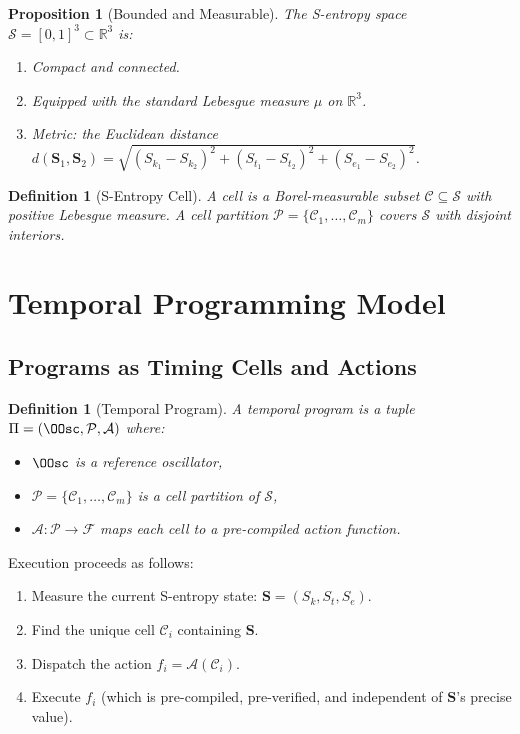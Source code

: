 \documentclass[twocolumn,11pt,a4paper]{article}
\newtheorem{proposition}[theorem]{Proposition}
\newtheorem{definition}[theorem]{Definition}
\newcommand{\Sk}{S_k}
\newcommand{\St}{S_t}
\newcommand{\Se}{S_e}
\newcommand{\Stuple}{\mathbf{S}}
\newcommand{\calC}{\mathcal{C}}
\newcommand{\calP}{\mathcal{P}}
\newcommand{\calS}{\mathcal{S}}
\begin{document}
\begin{proposition}[Bounded and Measurable]
The S-entropy space $\calS = [0,1]^3 \subset \mathbb{R}^3$ is:
\begin{enumerate}[nosep,label=(\roman*)]
  \item Compact and connected.
  \item Equipped with the standard Lebesgue measure $\mu$ on $\mathbb{R}^3$.
  \item Metric: the Euclidean distance $d(\Stuple_1, \Stuple_2) = \sqrt{(\Sk_1 - \Sk_2)^2 + (\St_1 - \St_2)^2 + (\Se_1 - \Se_2)^2}$.
\end{enumerate}
\end{proposition}

\begin{definition}[S-Entropy Cell]
A \emph{cell} is a Borel-measurable subset $\calC \subseteq \calS$ with positive Lebesgue measure. A \emph{cell partition} $\calP = \{\calC_1, \ldots, \calC_m\}$ covers $\calS$ with disjoint interiors.
\end{definition}

\section{Temporal Programming Model}
\label{sec:temporal}

\subsection{Programs as Timing Cells and Actions}

\begin{definition}[Temporal Program]
A \emph{temporal program} is a tuple $\Pi = (\OOsc, \calP, \mathcal{A})$ where:
\begin{itemize}[nosep,leftmargin=1em]
  \item $\OOsc$ is a reference oscillator,
  \item $\calP = \{\calC_1, \ldots, \calC_m\}$ is a cell partition of $\calS$,
  \item $\mathcal{A}: \calP \to \mathcal{F}$ maps each cell to a pre-compiled action function.
\end{itemize}
\end{definition}

Execution proceeds as follows:
\begin{enumerate}[nosep]
  \item Measure the current S-entropy state: $\Stuple = (\Sk, \St, \Se)$.
  \item Find the unique cell $\calC_i$ containing $\Stuple$.
  \item Dispatch the action $f_i = \mathcal{A}(\calC_i)$.
  \item Execute $f_i$ (which is pre-compiled, pre-verified, and independent of $\Stuple$'s precise value).
\end{enumerate}
\end{document}
